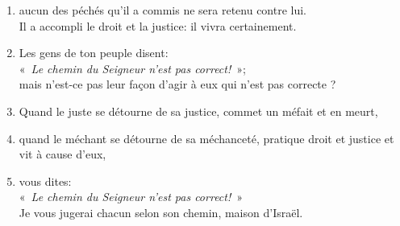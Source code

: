 \begin{enumerate}[leftmargin=\psleftmargin, labelsep = \pslabelsep, label={\arabic*}, font=\color{\pscolor}\small\textsuperscript, parsep=0em, itemsep=0em, topsep=0em ]
    \item aucun des péchés qu’il a commis ne sera retenu contre lui. \\ Il a accompli le droit et la justice: il vivra certainement. \verseSpace
    \item Les gens de ton peuple disent: \\ \decalage «~\textit{Le chemin du Seigneur n’est pas correct!}~»; \\ mais n’est-ce pas leur façon d’agir à eux qui n’est pas correcte ?
    \item Quand le juste se détourne de sa justice, commet un méfait et en meurt,
    \item quand le méchant se détourne de sa méchanceté, pratique droit et justice et vit à cause d’eux,
    \item vous dites: \\ \decalage «~\textit{Le chemin du Seigneur n’est pas correct!}~» \\ Je vous jugerai chacun selon son chemin, maison d’Israël. \parSpace

\end{enumerate}
